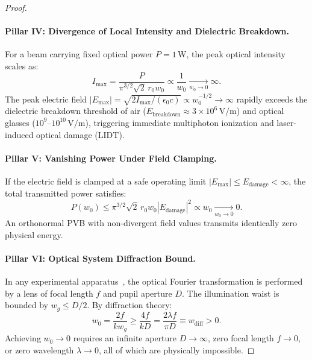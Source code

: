 \documentclass{optica-article}
\begin{document}
\begin{proof}
\paragraph{Pillar IV: Divergence of Local Intensity and Dielectric Breakdown.}
For a beam carrying fixed optical power $P = 1\,\text{W}$, the peak optical intensity scales as:
\begin{equation}
\boxed{I_{\max} = \frac{P}{\pi^{3/2} \sqrt{2} \, r_0 w_0} \propto \frac{1}{w_0} \xrightarrow[w_0 \to 0]{} \infty.}
\end{equation}
The peak electric field $|E_{\max}| = \sqrt{2 I_{\max} / (\epsilon_0 c)} \propto w_0^{-1/2} \to \infty$ rapidly exceeds the dielectric breakdown threshold of air ($E_{\text{breakdown}} \approx 3 \times 10^6\,\text{V/m}$) and optical glasses ($10^9\text{--}10^{10}\,\text{V/m}$), triggering immediate multiphoton ionization and laser-induced optical damage (LIDT).

\paragraph{Pillar V: Vanishing Power Under Field Clamping.}
If the electric field is clamped at a safe operating limit $|E_{\max}| \le E_{\text{damage}} < \infty$, the total transmitted power satisfies:
\begin{equation}
P(w_0) \le \pi^{3/2} \sqrt{2} \, r_0 w_0 |E_{\text{damage}}|^2 \propto w_0 \xrightarrow[w_0 \to 0]{} 0.
\end{equation}
An orthonormal PVB with non-divergent field values transmits identically zero physical energy.

\paragraph{Pillar VI: Optical System Diffraction Bound.}
In any experimental apparatus~\cite{Vaity2015,Villalba2023}, the optical Fourier transformation is performed by a lens of focal length $f$ and pupil aperture $D$. The illumination waist is bounded by $w_g \le D/2$. By diffraction theory:
\begin{equation}
w_0 = \frac{2 f}{k w_g} \ge \frac{4 f}{k D} = \frac{2 \lambda f}{\pi D} \equiv w_{\text{diff}} > 0.
\end{equation}
Achieving $w_0 \to 0$ requires an infinite aperture $D \to \infty$, zero focal length $f \to 0$, or zero wavelength $\lambda \to 0$, all of which are physically impossible.


\end{proof}
\end{document}
